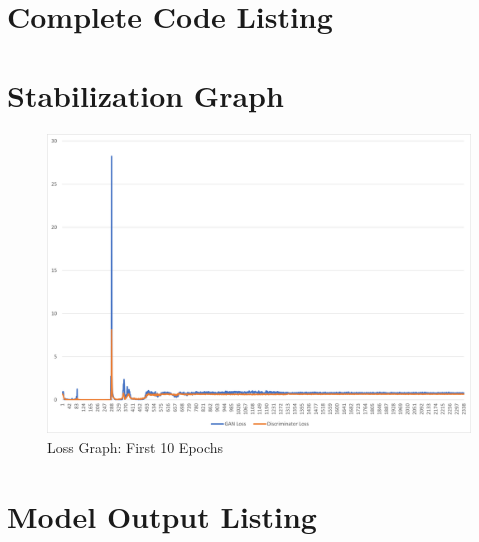 \documentclass{article}
\begin{document}
\begin{appendices}
\newpage
\section{Complete Code Listing} \label{codelist}
% 
\newpage
\section{Stabilization Graph} \label{graph_app}
\begin{figure}[H]
    \centering
    \includegraphics[width=6in]{csci-8110/hw-4/images/8110_hw4_loss_first_10.png}
    \caption{Loss Graph: First 10 Epochs}
    \label{fig:loss_graph_10}
\end{figure}

\newpage
\section{Model Output Listing} \label{modelouts}


\end{appendices}
\end{document}
